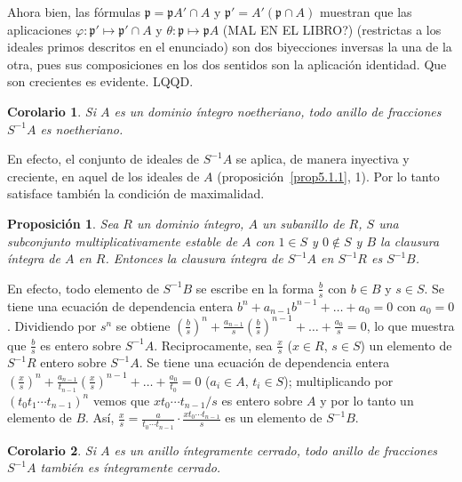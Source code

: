 \documentclass[bibtotoc,leqno,spanish]{amsbook}
\newcommand{\idl}[1]{\mathfrak{#1}}
\newcommand{\QED}{LQQD.}
\numberwithin{equation}{section}
\theoremstyle{note}
\theoremstyle{note}
\newtheorem{proposition}{Proposici\'on}
\newtheorem*{corollary*}{Corolario}
\theoremstyle{rem}
\numberwithin{theorem}{section}
\numberwithin{proposition}{section}
\numberwithin{definition}{section}
\numberwithin{lemma}{section}
\numberwithin{corollary}{section}
\numberwithin{example}{section}
\numberwithin{footnote}{section}%
\begin{document}
Ahora bien, las f\'ormulas $\idl{p} = \idl{p}A'\cap A$ y $\idl{p}' = A'(\idl{p}\cap A)$ muestran que
las aplicaciones $\varphi:\idl{p}'\mapsto\idl{p}'\cap A$ y $\theta : \idl{p}\mapsto\idl{p}A$ (MAL EN EL LIBRO?)
(restrictas a los ideales primos descritos en el enunciado) son dos biyecciones inversas la una de la otra, pues sus
composiciones en los dos sentidos son la aplicaci\'on identidad. Que son crecientes es evidente. \QED

\begin{corollary*}
Si $A$ es un dominio \'integro noetheriano, todo anillo de fracciones $S^{-1}A$ es noetheriano.
\end{corollary*}

En efecto, el conjunto de ideales de $S^{-1}A$ se aplica, de manera inyectiva y creciente, en aquel de los
ideales de $A$ (proposici\'on~\ref{prop5.1.1}, 1).
Por lo tanto satisface tambi\'en la condici\'on de maximalidad.

\begin{proposition}\label{prop5.1.2}
Sea $R$ un dominio \'integro, $A$ un subanillo de $R$, $S$ una subconjunto multiplicativamente estable de $A$ con
$1\in S$ y $0\notin S$ y $B$ la clausura \'integra de $A$ en $R$. Entonces la clausura \'integra de $S^{-1}A$ en
$S^{-1}R$ es $S^{-1}B$.
\end{proposition}

En efecto, todo elemento de $S^{-1}B$ se escribe en la forma $\frac{b}{s}$ con $b\in B$ y
$s\in S$. Se tiene una ecuaci\'on de dependencia entera $b^{n}+a_{n-1}b^{n-1}+\dots+a_{0}=0$ con
$a_{0}=0$. Dividiendo por $s^{n}$ se obtiene $\left(\frac{b}{s}\right)^{n}+\frac{a_{n-1}}{s}\left(\frac{b}{s}\right)^{n-1}
+\dots+\frac{a_{0}}{s}=0$, lo que muestra que $\frac{b}{s}$ es entero sobre $S^{-1}A$. Reciprocamente, sea
$\frac{x}{s}$ ($x\in R$, $s\in S$) un elemento de $S^{-1}R$ entero sobre $S^{-1}A$. Se tiene una ecuaci\'on de
dependencia entera $\left(\frac{x}{s}\right)^{n}+\frac{a_{n-1}}{t_{n-1}}\left(\frac{x}{s}\right)^{n-1}+
\dots+\frac{a_{0}}{t_{0}}=0$ ($a_{i}\in A$, $t_{i}\in S$); multiplicando por $(t_{0}t_{1}\cdots t_{n-1})^{n}$
vemos que $xt_{0}\cdots t_{n-1}/s$ es entero sobre $A$ y por lo tanto un elemento de $B$. As\'i,
$\frac{x}{s} = \frac{a}{t_{0}\cdots t_{n-1}}\cdot\frac{xt_{0}\cdots t_{n-1}}{s}$ es un elemento de $S^{-1}B$.

\begin{corollary*}
Si $A$ es un anillo \'integramente cerrado, todo anillo de fracciones $S^{-1}A$ tambi\'en es \'integramente
cerrado.
\end{corollary*}
\end{document}
